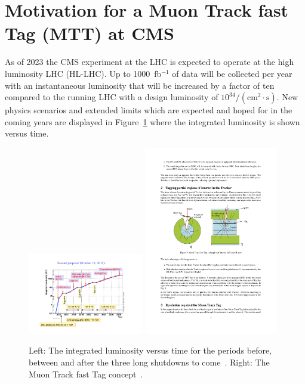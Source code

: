 \section{Motivation for a Muon Track fast Tag (MTT) at CMS}
\label{sec:intro}
As of 2023 the CMS experiment at the LHC is expected to operate at the high luminosity LHC (HL-LHC). Up to 1000~fb$^{-1}$ of data will be collected per year with an 
instantaneous luminosity that will be increased by a factor of ten compared to the running LHC with a design luminosity of $10^{34}/(\mathrm{cm}^2 \cdot\mathrm{s})$. New physics 
scenarios and extended limits which are expected and hoped for in the coming years are displayed in Figure~\ref{fig:schedule_concept} where the integrated luminosity is shown versus 
time. 
\begin{figure}[htbp]
\centering
\includegraphics[width=0.45\textwidth]{Figures/pooth/schedule.pdf}
\includegraphics[width=0.52\textwidth]{Figures/pooth/mtt_concept_a.pdf}
\caption{Left: The integrated luminosity versus time for the periods before, between and after the three long shutdowns to come~\cite{schedule}. Right: The Muon Track fast Tag concept~\cite{mtt_concept}. } 
\label{fig:schedule_concept}
\end{figure}
